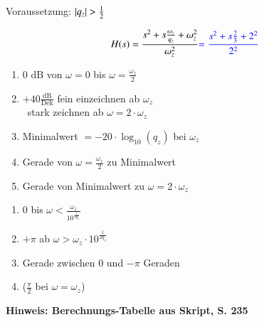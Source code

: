 \begin{minipage}[t]{0.48\columnwidth}
    \raggedright
    \begin{center}
        Voraussetzung: $\left|q_z\right| > \frac{1}{2}$
    \end{center}
    $$ H(s) = \frac{s^2 + s \frac{\omega_z}{q_z} + \omega_z^2}{\omega_z^2} {\color{blue}= \frac{s^2 + s \frac{2}{3} + 2^2}{2^2}} $$

    
\end{minipage}
\hfill
\begin{minipage}[t]{0.48\columnwidth}
        \begin{enumerate}
            \item 0 $\text{dB}$ von $\omega=0$ bis $\omega=\frac{\omega_z}{2}$
            \item $+40\frac{\text{dB}}{\text{Dek}}$ fein einzeichnen ab $\omega_z$\\
            \textrightarrow\ stark zeichnen ab $\omega = 2 \cdot \omega_z$
            \item Minimalwert $= -20\cdot \log_{10}(q_z)$ bei $\omega_z$
            \item Gerade von $\omega=\frac{\omega_z}{2}$ zu Minimalwert 
            \item Gerade von Minimalwert zu $\omega = 2 \cdot \omega_z$
        \end{enumerate}
        \begin{enumerate}
            \item 0 bis $\omega < \frac{\omega_z}{10^{\frac{1}{2 q_z}}}$
            \item $+ \pi$ ab $\omega > \omega_z \cdot 10^{\frac{1}{2 q_z}}$
            \item Gerade zwischen $0$ und $- \pi$ Geraden
            \item ($\frac{\pi}{2}$ bei $\omega = \omega_z$)
        \end{enumerate}
\end{minipage}

\textbf{Hinweis: Berechnungs-Tabelle aus Skript, S. 235} 

\begingroup
\renewcommand{\arraystretch}{2}
\setlength{\tabcolsep}{0mm}
\endgroup
\renewcommand{\arraystretch}{1}

